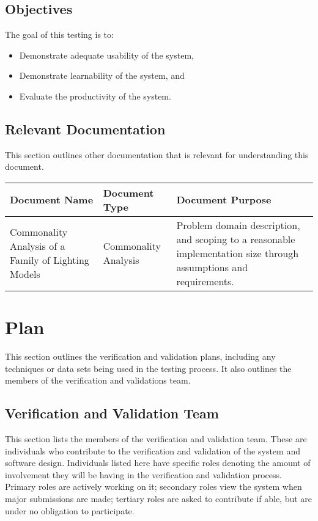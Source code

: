 \documentclass[12pt, titlepage]{article}
\begin{document}
\subsection{Objectives}
The goal of this testing is to:

\begin{itemize}
	\item Demonstrate adequate usability of the system,
	\item Demonstrate learnability of the system, and
	\item Evaluate the productivity of the system.
\end{itemize}
%

\pagebreak
\subsection{Relevant Documentation}
This section outlines other documentation that is relevant for understanding 
this document.
\begin{table}[h]
	\begin{tabular}{|p{3.5cm}|p{3cm}|p{8cm}|}
		\hline
	\textbf{Document Name} & \textbf{Document Type} & \textbf{Document Purpose} 
	 \\
		\hline
		Commonality Analysis of a Family of Lighting Models& Commonality 
		Analysis & Problem domain description, and scoping to a reasonable 
		implementation size through assumptions and requirements. \\ 
		\hline
	\end{tabular}
\end{table}

\section{Plan}
This section outlines the verification and validation plans, including any 
techniques or data sets being used in the testing process. It also outlines the 
members of the verification and validations team.
	
\subsection{Verification and Validation Team}
This section lists the members of the verification and validation team. These 
are individuals who contribute to the verification and validation of the system 
and software design. Individuals listed here have specific roles denoting the 
amount of involvement they will be having in the verification and validation 
process. Primary roles are actively working on it; secondary roles view the 
system when major submissions are made; tertiary roles are asked to contribute 
if able, but are under no obligation to participate.
\end{document}
